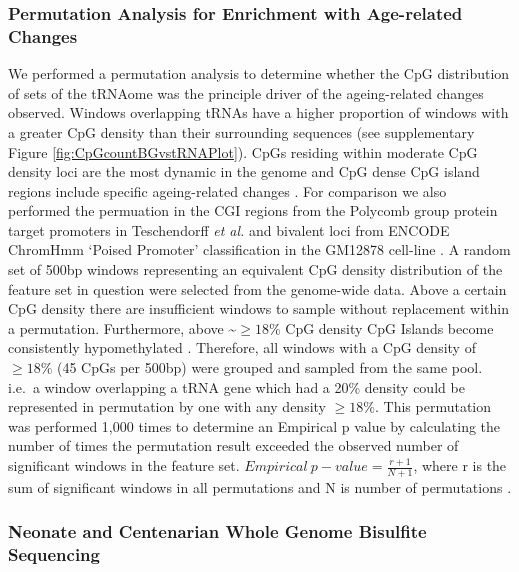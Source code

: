 \documentclass[
]{book}
\begin{document}
\hypertarget{AgeErichmentPermutation}{%
\subsubsection{Permutation Analysis for Enrichment with Age-related Changes}\label{AgeErichmentPermutation}}

We performed a permutation analysis to determine whether the CpG distribution of sets of the tRNAome was the principle driver of the ageing-related changes observed.
Windows overlapping tRNAs have a higher proportion of windows with a greater CpG density than their surrounding sequences (see supplementary Figure \ref{fig:CpGcountBGvstRNAPlot}).
CpGs residing within moderate CpG density loci are the most dynamic in the genome \citep{Ziller2013} and CpG dense CpG island regions include specific ageing-related changes \citep{Teschendorff2010, Rakyan2010, Bell2016}.
For comparison we also performed the permuation in the CGI regions from the Polycomb group protein target promoters in Teschendorff \emph{et al.} \citep{Teschendorff2010} and bivalent loci from ENCODE ChromHmm `Poised Promoter' classification in the GM12878 cell-line \citep{Ernst2011}.
A random set of 500bp windows representing an equivalent CpG density distribution of the feature set in question were selected from the genome-wide data.
Above a certain CpG density there are insufficient windows to sample without replacement within a permutation.
Furthermore, above \textasciitilde{}\(\ge18\%\) CpG density CpG Islands become consistently hypomethylated \citep{Bell2012a}.
Therefore, all windows with a CpG density of \(\ge18\%\) (45 CpGs per 500bp) were grouped and sampled from the same pool.
i.e.~a window overlapping a tRNA gene which had a 20\% density could be represented in permutation by one with any density \(\ge18\%\).
This permutation was performed 1,000 times to determine an Empirical p value by calculating the number of times the permutation result exceeded the observed number of significant windows in the feature set.
\(Empirical~p-value = \frac{r+1}{N+1}\), where r is the sum of significant windows in all permutations and N is number of permutations \citep{North2003}.

\hypertarget{neonate-and-centenarian-whole-genome-bisulfite-sequencing}{%
\subsubsection{Neonate and Centenarian Whole Genome Bisulfite Sequencing}\label{neonate-and-centenarian-whole-genome-bisulfite-sequencing}}
\end{document}
